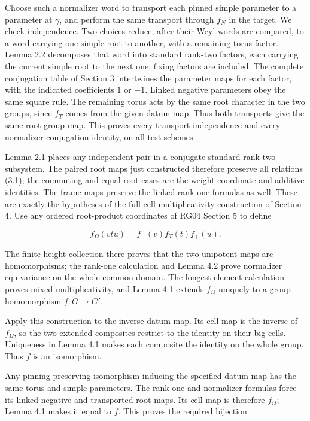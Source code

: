 \documentclass[11pt,a4paper,openany]{report}
\begin{document}
Choose such a normalizer word to transport each pinned simple parameter to a parameter at \(\gamma\), and perform the same transport through \(f_N\) in the target. We check independence. Two choices reduce, after their Weyl words are compared, to a word carrying one simple root to another, with a remaining torus factor. Lemma 2.2 decomposes that word into standard rank-two factors, each carrying the current simple root to the next one; fixing factors are included. The complete conjugation table of Section 3 intertwines the parameter maps for each factor, with the indicated coefficients \(1\) or \(-1\). Linked negative parameters obey the same square rule. The remaining torus acts by the same root character in the two groups, since \(f_T\) comes from the given datum map. Thus both transports give the same root-group map. This proves every transport independence and every normalizer-conjugation identity, on all test schemes.

Lemma 2.1 places any independent pair in a conjugate standard rank-two subsystem. The paired root maps just constructed therefore preserve all relations (3.1); the commuting and equal-root cases are the weight-coordinate and additive identities. The frame maps preserve the linked rank-one formulas as well. These are exactly the hypotheses of the full cell-multiplicativity construction of Section 4. Use any ordered root-product coordinates of RG04 Section 5 to define

\[
f_\Omega(vtu)=f_-(v)f_T(t)f_+(u).
\]

The finite height collection there proves that the two unipotent maps are homomorphisms; the rank-one calculation and Lemma 4.2 prove normalizer equivariance on the whole common domain. The longest-element calculation proves mixed multiplicativity, and Lemma 4.1 extends \(f_\Omega\) uniquely to a group homomorphism \(f:G\to G'\).

Apply this construction to the inverse datum map. Its cell map is the inverse of \(f_\Omega\), so the two extended composites restrict to the identity on their big cells. Uniqueness in Lemma 4.1 makes each composite the identity on the whole group. Thus \(f\) is an isomorphism.

Any pinning-preserving isomorphism inducing the specified datum map has the same torus and simple parameters. The rank-one and normalizer formulas force its linked negative and transported root maps. Its cell map is therefore \(f_\Omega\); Lemma 4.1 makes it equal to \(f\). This proves the required bijection.
\end{document}
